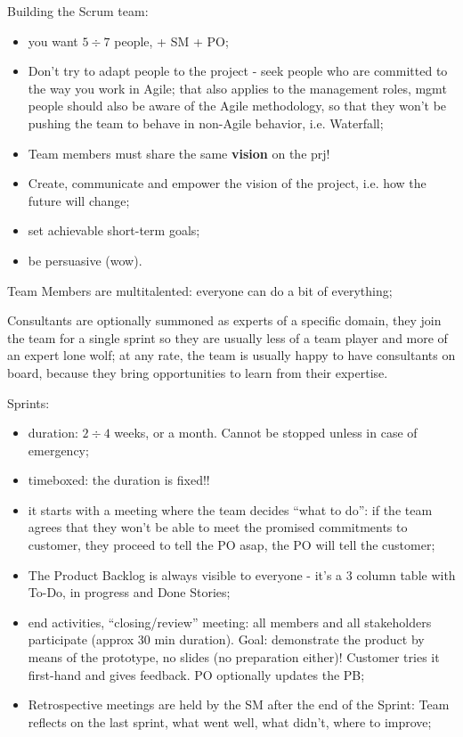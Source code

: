 \noindent Building the Scrum team:
\begin{itemize}
    \item you want $5\div7$ people, + SM + PO;
    \item Don't try to adapt people to the project - seek people who are committed to the way you work in Agile; that also applies to the management roles, mgmt people should also be aware of the Agile methodology, so that they won't be pushing the team to behave in non-Agile behavior, i.e. Waterfall;
    \item Team members must share the same \textbf{vision} on the prj!
    \item Create, communicate and empower the vision of the project, i.e. how the future will change;
    \item set achievable short-term goals;
    \item be persuasive (wow).
\end{itemize}

\noindent Team Members are multitalented: everyone can do a bit of everything;

 \noindent Consultants are optionally summoned as experts of a specific domain, they join the team for a single sprint so they are usually less of a team player and more of an expert lone wolf; at any rate, the team is usually happy to have consultants on board, because they bring opportunities to learn from their expertise.

\noindent Sprints:
\begin{itemize}
    \item duration: $2\div4$ weeks, or a month. Cannot be stopped unless in case of emergency;
    \item timeboxed: the duration is fixed!!
    \item it starts with a meeting where the team decides ``what to do'': if the team agrees that they won't be able to meet the promised commitments to customer, they proceed to tell the PO asap, the PO will tell the customer;
    \item The Product Backlog is always visible to everyone - it's a 3 column table with To-Do, in progress and Done Stories;
    \item end activities, ``closing/review'' meeting: all members and all stakeholders participate (approx 30 min duration). Goal: demonstrate the product by means of the prototype, no slides (no preparation either)! Customer tries it first-hand and gives feedback. PO optionally updates the PB;
    \item Retrospective meetings are held by the SM after the end of the Sprint: Team reflects on the last sprint, what went well, what didn't, where to improve;
\end{itemize}

